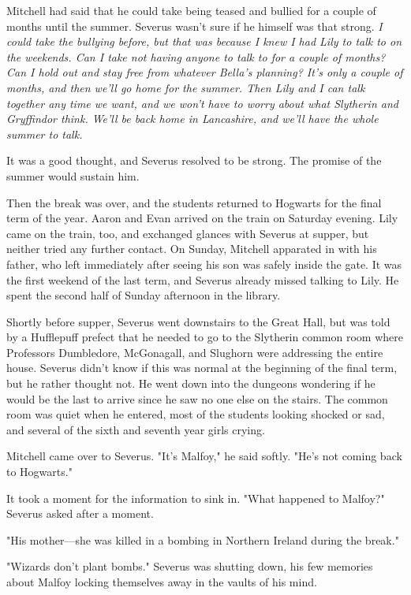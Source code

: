 Mitchell had said that he could take being teased and bullied for a couple of months until the summer. Severus wasn't sure if he himself was that strong. \emph{I could take the bullying before, but that was because I knew I had Lily to talk to on the weekends. Can I take not having anyone to talk to for a couple of months? Can I hold out and stay free from whatever Bella's planning? It's only a couple of months, and then we'll go home for the summer. Then Lily and I can talk together any time we want, and we won't have to worry about what Slytherin and Gryffindor think. We'll be back home in Lancashire, and we'll have the whole summer to talk.}

It was a good thought, and Severus resolved to be strong. The promise of the summer would sustain him.

Then the break was over, and the students returned to Hogwarts for the final term of the year. Aaron and Evan arrived on the train on Saturday evening. Lily came on the train, too, and exchanged glances with Severus at supper, but neither tried any further contact. On Sunday, Mitchell apparated in with his father, who left immediately after seeing his son was safely inside the gate. It was the first weekend of the last term, and Severus already missed talking to Lily. He spent the second half of Sunday afternoon in the library.

Shortly before supper, Severus went downstairs to the Great Hall, but was told by a Hufflepuff prefect that he needed to go to the Slytherin common room where Professors Dumbledore, McGonagall, and Slughorn were addressing the entire house. Severus didn't know if this was normal at the beginning of the final term, but he rather thought not. He went down into the dungeons wondering if he would be the last to arrive since he saw no one else on the stairs. The common room was quiet when he entered, most of the students looking shocked or sad, and several of the sixth and seventh year girls crying.

Mitchell came over to Severus. "It's Malfoy," he said softly. "He's not coming back to Hogwarts."

It took a moment for the information to sink in. "What happened to Malfoy?" Severus asked after a moment.

"His mother—she was killed in a bombing in Northern Ireland during the break."

"Wizards don't plant bombs." Severus was shutting down, his few memories about Malfoy locking themselves away in the vaults of his mind.

